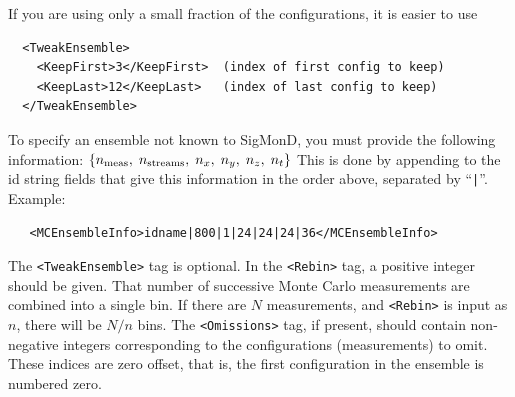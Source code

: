 \documentclass[12pt]{article}
\newcommand{\vb}{\texttt}
\begin{document}
If you are using only a small fraction of the configurations, it is 
easier to use
\begin{verbatim}                                                    
  <TweakEnsemble>                                                 
    <KeepFirst>3</KeepFirst>  (index of first config to keep)     
    <KeepLast>12</KeepLast>   (index of last config to keep)      
  </TweakEnsemble>                                                   
\end{verbatim}

To specify an ensemble not known to SigMonD, you must provide
the following information:
$\{n_{\rm meas}, \; n_{\rm streams}, \; n_x, \; n_y, \; n_z, \; n_t\}$
This is done by appending to the id string fields that give
this information in the order above, separated by ``\vb{|}''.
Example:
\begin{verbatim}
   <MCEnsembleInfo>idname|800|1|24|24|24|36</MCEnsembleInfo>
\end{verbatim}

The \vb{<TweakEnsemble>} tag is optional.
In the \vb{<Rebin>} tag, a positive integer should be given.  That number of
successive Monte Carlo measurements are combined into a single bin.
If there are $N$ measurements, and \vb{<Rebin>} is input as $n$,
there will be $N/n$ bins. The \vb{<Omissions>} tag, if present,
should contain non-negative integers corresponding to the configurations
(measurements) to omit. These indices are zero offset, that is, the
first configuration in the ensemble is numbered zero.
\end{document}
